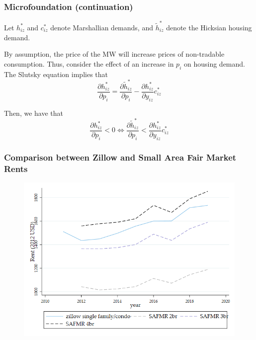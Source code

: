 \documentclass[aspectratio=169, t]{beamer}
\begin{document}
\begin{frame}
	\frametitle{Microfoundation (continuation)}

	Let $h_{iz}^*$ and $c_{iz}^*$ denote Marshallian demands, and 
	$\tilde h_{iz}^*$ denote the Hicksian housing demand.

	\vspace{2mm}

	By assumption, the price of the MW will increase prices of non-tradable consumption.
	Thus, consider the effect of an increase in $p_i$ on housing demand.
	The Slutsky equation implies that
	\[
	\frac{\partial h_{iz}^*}{\partial p_i} 
	= \frac{\partial \tilde h_{iz}^*}{\partial p_i} 
	- \frac{\partial h_{iz}^*}{\partial y_{iz}} c_{iz}^*
	\]

	Then, we have that 
	\[
	\frac{\partial h_{iz}^*}{\partial p_i} < 0 \iff 
	\frac{\partial \tilde h_{iz}^*}{\partial p_i} 
	< \frac{\partial h_{iz}^*}{\partial y_{iz}} c_{iz}^*
	\]

	\hyperlink{discuss4}{}
\end{frame}

\begin{frame}[label = zillow_safmr]
	\frametitle{Comparison between Zillow and Small Area Fair Market Rents}
    \begin{figure}
    	\centering
	\includegraphics[scale = 0.32]{zillow_benchmark/output/trend_zillow_safmr_zipcode_m1.png}
    \end{figure}
	\hyperlink{zillow_data}{}
\end{frame}
\end{document}

